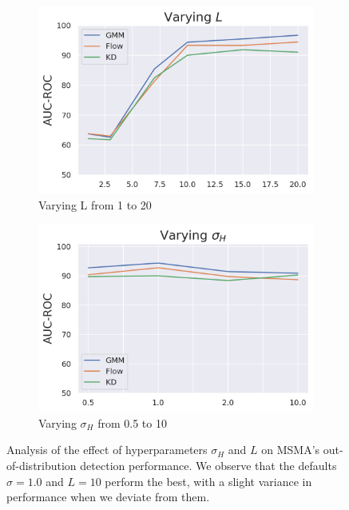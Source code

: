 \begin{figure}[tbhp]

\centering
\begin{subfigure}[b]{0.45\textwidth}
\includegraphics[scale=0.4]{figures/L_analysis.png}
\caption{Varying L from 1 to 20}
\label{fig:L_analysis}
\end{subfigure}
\begin{subfigure}[b]{0.45\textwidth}
    \includegraphics[scale=0.4]{figures/sigma_analysis.png}
    \caption{Varying $\sigma_H$ from 0.5 to 10}
    \label{fig:sigma_analysis}
\end{subfigure}
\caption{Analysis of the effect of hyperparameters $\sigma_H$ and $L$ on MSMA's out-of-distribution detection performance. We observe that the defaults $\sigma=1.0$ and $L=10$ perform the best, with a slight variance in performance when we deviate from them.}
\label{fig:analysis}
\end{figure}


